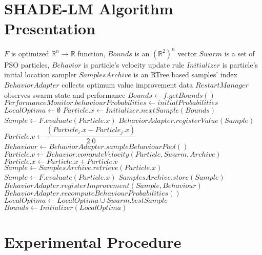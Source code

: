 \documentclass[sigconf]{acmart}
\begin{document}
\section{SHADE-LM Algorithm Presentation}

\begin{algorithm}[H]
	\begin{algorithmic}[1]
	\footnotesize
  \State $F$ is optimized $\mathbb{R}^n \rightarrow \mathbb{R}$ function, $Bounds$ is an $\left(\mathbb{R}^2\right)^n$ vector
  \State $Swarm$ is a set of PSO particles, $Behavior$ is particle's velocity update rule
  \State $Initializer$ is particle's initial location sampler
  \State $SamplesArchive$ is an RTree based samples' index
  \State $BehaviorAdapter$ collects optimum value improvement data
  \State $RestartManager$ observes swarm state and performance
  \State $Bounds \gets f.getBounds()$ 
  \State $PerformanceMonitor.behaviourProbabilities \gets initialProbabilities$
  \State $LocalOptima \gets \emptyset$ 
		  \State $Particle.x \gets Initializer.nextSample(Bounds)$
		  \State $Sample \gets F.evaluate(Particle.x)$
		  \State $BehaviorAdapter.registerValue(Sample)$
	  \EndFor
		  \State $Particle.v \gets \dfrac{(Particle_i.x - Particle_j.x)}{2.0}$
	  \EndFor
			  \State $Behaviour \gets BehaviorAdapter.sampleBehaviourPool()$ 
			  \State $Particle.v \gets Behavior.computeVelocity(Particle,Swarm,Archive)$
			  \State $Particle.x \gets Particle.x + Particle.v$
				  \State $Sample \gets SamplesArchive.retrieve(Particle.x)$
			  \Else
				  \State $Sample \gets F.evaluate(Particle.x)$
				  \State $SamplesArchive.store(Sample)$
			  \EndIf
			  \State $BehaviorAdapter.registerImprovement(Sample,Behaviour)$
		  \EndFor
		  \State $BehaviorAdapter.recomputeBehaviourProbabilities()$
	  \EndWhile
	  \State $LocalOptima \gets LocalOptima \cup Swarm.bestSample$
	  \State $Bounds \gets Initializer(LocalOptima)$ 
  \EndWhile
  \caption{M-GAPSO high--level pseudocode%
  \label{alg:GAPSO}}
  \end{algorithmic}
  \end{algorithm}


%
\section{Experimental Procedure}
%
\end{document}
